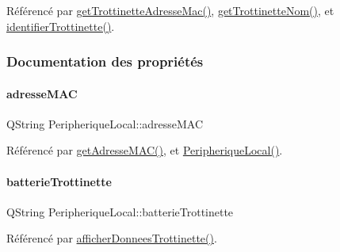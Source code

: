 Référencé par \hyperlink{class_peripherique_local_a465658a204541e309f2647d473f658d8}{get\+Trottinette\+Adresse\+Mac()}, \hyperlink{class_peripherique_local_ac81a942b4d1d9e848649073c53ed6917}{get\+Trottinette\+Nom()}, et \hyperlink{class_peripherique_local_aab3b5a9b584b0191b9f690add1cfa6ed}{identifier\+Trottinette()}.



\subsubsection{Documentation des propriétés}
\mbox{\label{class_peripherique_local_a76ccdcef703e7aff1f6f66dc615feba7}} 
\paragraph{\texorpdfstring{adresse\+M\+AC}{adresseMAC}}
{\footnotesize\ttfamily Q\+String Peripherique\+Local\+::adresse\+M\+AC}



Référencé par \hyperlink{class_peripherique_local_a79ce44141050f589d17f119a3b17444c}{get\+Adresse\+M\+A\+C()}, et \hyperlink{class_peripherique_local_a99a652b8659a3692f164cf1a0382e4bf}{Peripherique\+Local()}.

\mbox{\label{class_peripherique_local_a7feac59a6fbe481321aa1734d13f05c2}} 
\paragraph{\texorpdfstring{batterie\+Trottinette}{batterieTrottinette}}
{\footnotesize\ttfamily Q\+String Peripherique\+Local\+::batterie\+Trottinette}



Référencé par \hyperlink{class_peripherique_local_a5702930929fea3e197fc1938a2303961}{afficher\+Donnees\+Trottinette()}.

\mbox{\label{class_peripherique_local_a8b994159d5d56a45b693b191963d5053}} 
